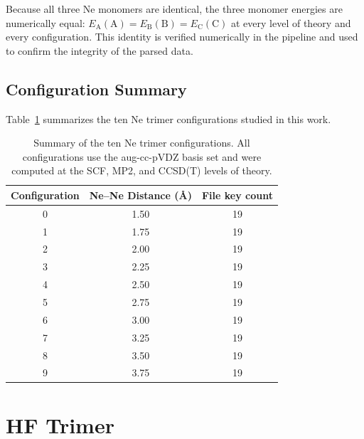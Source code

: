 Because all three Ne monomers are identical, the three monomer
energies are numerically equal: $E_\text{A}(\text{A}) =
E_\text{B}(\text{B}) = E_\text{C}(\text{C})$ at every level of theory
and every configuration. This identity is verified numerically in the
pipeline and used to confirm the integrity of the parsed data.

\subsection{Configuration Summary}

Table~\ref{tab:ne_trimer_configs} summarizes the ten Ne trimer
configurations studied in this work.

\begin{table}[!ht]
    \centering
    \caption{Summary of the ten Ne trimer configurations.
    All configurations use the aug-cc-pVDZ basis set and were computed
    at the SCF, MP2, and CCSD(T) levels of theory.}
    \label{tab:ne_trimer_configs}
    \begin{tabular}{ccc}
        \toprule
        Configuration & Ne--Ne Distance (\AA) & File key count \\
        \midrule
        0 & 1.50 & 19 \\
        1 & 1.75 & 19 \\
        2 & 2.00 & 19 \\
        3 & 2.25 & 19 \\
        4 & 2.50 & 19 \\
        5 & 2.75 & 19 \\
        6 & 3.00 & 19 \\
        7 & 3.25 & 19 \\
        8 & 3.50 & 19 \\
        9 & 3.75 & 19 \\
        \bottomrule
    \end{tabular}
\end{table}

\section{HF Trimer}

